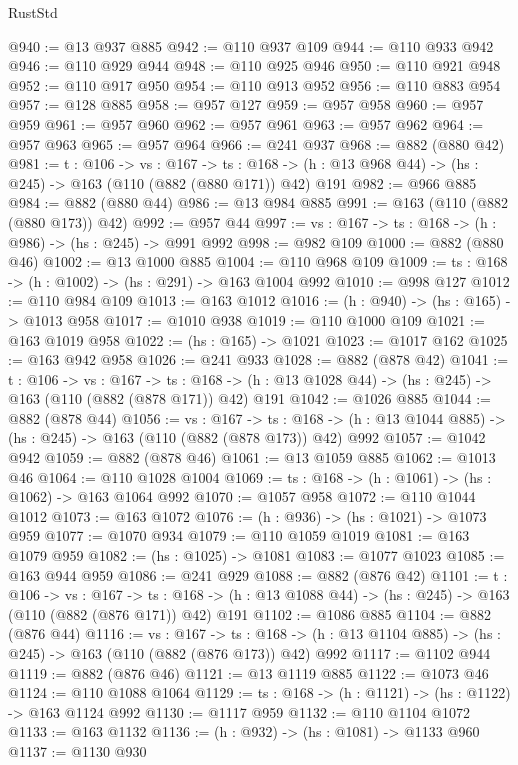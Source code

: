 \begin{lexlean}{RustStd}
\begin{coremodule}
@940 := @13 @937 @885
@942 := @110 @937 @109
@944 := @110 @933 @942
@946 := @110 @929 @944
@948 := @110 @925 @946
@950 := @110 @921 @948
@952 := @110 @917 @950
@954 := @110 @913 @952
@956 := @110 @883 @954
@957 := @128 @885
@958 := @957 @127
@959 := @957 @958
@960 := @957 @959
@961 := @957 @960
@962 := @957 @961
@963 := @957 @962
@964 := @957 @963
@965 := @957 @964
@966 := @241 @937
@968 := @882 (@880 @42)
@981 := {t : @106} ->
  {vs : @167} ->
  {ts : @168} -> (h : @13 @968 @44) -> (hs : @245) -> @163 (@110 (@882 (@880 @171)) @42) @191
@982 := @966 @885
@984 := @882 (@880 @44)
@986 := @13 @984 @885
@991 := @163 (@110 (@882 (@880 @173)) @42)
@992 := @957 @44
@997 := {vs : @167} -> {ts : @168} -> (h : @986) -> (hs : @245) -> @991 @992
@998 := @982 @109
@1000 := @882 (@880 @46)
@1002 := @13 @1000 @885
@1004 := @110 @968 @109
@1009 := {ts : @168} -> (h : @1002) -> (hs : @291) -> @163 @1004 @992
@1010 := @998 @127
@1012 := @110 @984 @109
@1013 := @163 @1012
@1016 := (h : @940) -> (hs : @165) -> @1013 @958
@1017 := @1010 @938
@1019 := @110 @1000 @109
@1021 := @163 @1019 @958
@1022 := (hs : @165) -> @1021
@1023 := @1017 @162
@1025 := @163 @942 @958
@1026 := @241 @933
@1028 := @882 (@878 @42)
@1041 := {t : @106} ->
  {vs : @167} ->
  {ts : @168} -> (h : @13 @1028 @44) -> (hs : @245) -> @163 (@110 (@882 (@878 @171)) @42) @191
@1042 := @1026 @885
@1044 := @882 (@878 @44)
@1056 := {vs : @167} ->
  {ts : @168} -> (h : @13 @1044 @885) -> (hs : @245) -> @163 (@110 (@882 (@878 @173)) @42) @992
@1057 := @1042 @942
@1059 := @882 (@878 @46)
@1061 := @13 @1059 @885
@1062 := @1013 @46
@1064 := @110 @1028 @1004
@1069 := {ts : @168} -> (h : @1061) -> (hs : @1062) -> @163 @1064 @992
@1070 := @1057 @958
@1072 := @110 @1044 @1012
@1073 := @163 @1072
@1076 := (h : @936) -> (hs : @1021) -> @1073 @959
@1077 := @1070 @934
@1079 := @110 @1059 @1019
@1081 := @163 @1079 @959
@1082 := (hs : @1025) -> @1081
@1083 := @1077 @1023
@1085 := @163 @944 @959
@1086 := @241 @929
@1088 := @882 (@876 @42)
@1101 := {t : @106} ->
  {vs : @167} ->
  {ts : @168} -> (h : @13 @1088 @44) -> (hs : @245) -> @163 (@110 (@882 (@876 @171)) @42) @191
@1102 := @1086 @885
@1104 := @882 (@876 @44)
@1116 := {vs : @167} ->
  {ts : @168} -> (h : @13 @1104 @885) -> (hs : @245) -> @163 (@110 (@882 (@876 @173)) @42) @992
@1117 := @1102 @944
@1119 := @882 (@876 @46)
@1121 := @13 @1119 @885
@1122 := @1073 @46
@1124 := @110 @1088 @1064
@1129 := {ts : @168} -> (h : @1121) -> (hs : @1122) -> @163 @1124 @992
@1130 := @1117 @959
@1132 := @110 @1104 @1072
@1133 := @163 @1132
@1136 := (h : @932) -> (hs : @1081) -> @1133 @960
@1137 := @1130 @930

\end{coremodule}
\end{lexlean}
